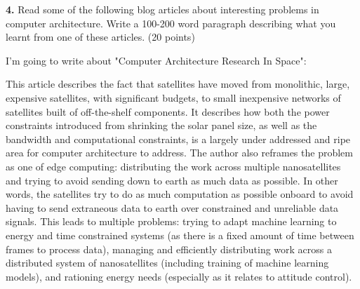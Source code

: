 \documentclass{article}
\begin{document}
\clearpage

\textbf{4.} Read some of the following blog articles
about interesting problems in computer architecture.
Write a 100-200 word paragraph describing what you
learnt from one of these articles. (20 points)

I'm going to write about "Computer Architecture Research In Space":

This article describes the fact that satellites have moved
from monolithic, large, expensive satellites, with
significant budgets, to small inexpensive networks
of satellites built of off-the-shelf components.
It describes how both the power constraints introduced
from shrinking the solar panel size, as well as the
bandwidth and computational constraints, is a largely
under addressed and ripe area for computer architecture
to address. The author also reframes the problem as
one of edge computing: distributing the work across
multiple nanosatellites and trying to avoid sending
down to earth as much data as possible. In other words,
the satellites try to do as much computation as possible
onboard to avoid having to send extraneous data to earth
over constrained and unreliable data signals. This leads
to multiple problems: trying to adapt machine learning
to energy and time constrained systems (as there is a
fixed amount of time between frames to process data),
managing and efficiently distributing work across a
distributed system of nanosatellites (including training
of machine learning models), and rationing energy needs
(especially as it relates to attitude control).
\end{document}
